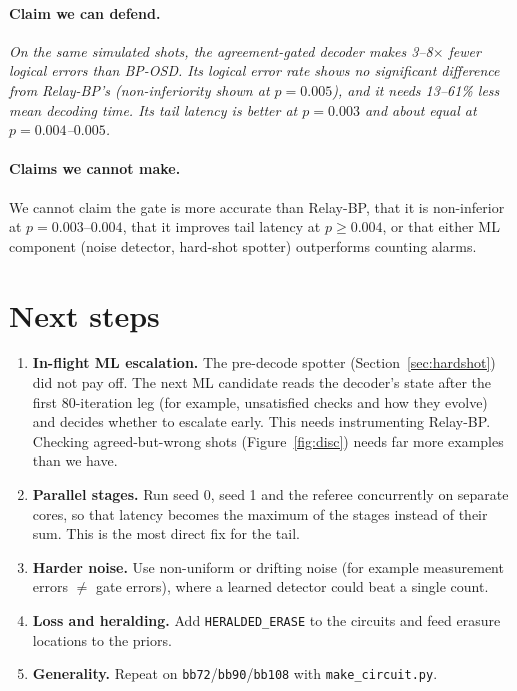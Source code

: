\documentclass[11pt]{article}
\begin{document}
\paragraph{Claim we can defend.} \emph{On the same simulated shots, the agreement-gated decoder makes 3--8$\times$ fewer
logical errors than BP-OSD. Its logical error rate shows no significant difference from Relay-BP's (non-inferiority shown at $p=0.005$), and it needs
13--61\% less mean decoding time. Its tail latency is better at $p=0.003$ and about equal at $p=0.004$--$0.005$.}

\paragraph{Claims we cannot make.} We cannot claim the gate is more accurate than Relay-BP, that it is non-inferior at $p=0.003$--$0.004$, that it improves tail latency at $p\ge0.004$,
or that either ML component (noise detector, hard-shot spotter) outperforms counting alarms.

\section{Next steps}\label{sec:next}
\begin{enumerate}
  \item \textbf{In-flight ML escalation.} The pre-decode spotter (Section~\ref{sec:hardshot}) did not pay off. The next ML candidate reads
        the decoder's state after the first 80-iteration leg (for example, unsatisfied checks and how they evolve) and decides whether to escalate
        early. This needs instrumenting Relay-BP. Checking agreed-but-wrong shots (Figure~\ref{fig:disc}) needs far more examples than we have.
  \item \textbf{Parallel stages.} Run seed 0, seed 1 and the referee concurrently on separate cores, so that latency becomes the
        maximum of the stages instead of their sum. This is the most direct fix for the tail.
  \item \textbf{Harder noise.} Use non-uniform or drifting noise (for example measurement errors $\ne$ gate errors), where a learned
        detector could beat a single count.
  \item \textbf{Loss and heralding.} Add \texttt{HERALDED\_ERASE} to the circuits and feed erasure locations to the priors.
  \item \textbf{Generality.} Repeat on \texttt{bb72}/\texttt{bb90}/\texttt{bb108} with \texttt{make\_circuit.py}.
\end{enumerate}
\end{document}
